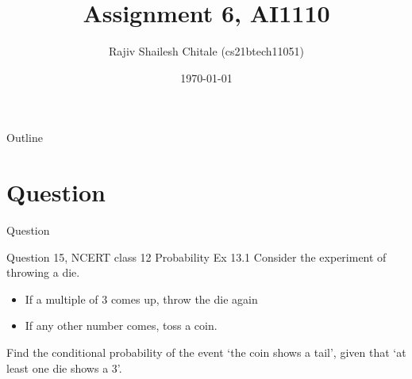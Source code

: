 \documentclass{beamer}
\begin{document}
\let\StandardTheFigure\thefigure
\let\vec\mathbf

\def\putbox#1#2#3{\makebox[0in][l]{\makebox[#1][l]{}\raisebox{\baselineskip}[0in][0in]{\raisebox{#2}[0in][0in]{#3}}}}
     \def\rightbox#1{\makebox[0in][r]{#1}}
     \def\centbox#1{\makebox[0in]{#1}}
     \def\topbox#1{\raisebox{-\baselineskip}[0in][0in]{#1}}
     \def\midbox#1{\raisebox{-0.5\baselineskip}[0in][0in]{#1}}
\vspace{3cm}


\title{Assignment 6, AI1110} 
\author{Rajiv Shailesh Chitale (cs21btech11051)}
\date{\today}
\logo{\large \LaTeX{}}
\begin{frame}
    \titlepage 
\end{frame}

\logo{}

\begin{frame}{Outline}
    \tableofcontents
\end{frame}
\section{Question}

\begin{frame}{Question}
     \begin{block}{ Question 15, NCERT class 12 Probability Ex 13.1}
    Consider the experiment of throwing a die.
    \begin{itemize}
        \item If a multiple of 3 comes up, throw the die again
        \item If any other number comes, toss a coin.
    \end{itemize}
     Find the conditional probability of the event \lq the coin shows a tail\rq, given that \lq at least one die shows a 3\rq.
     \end{block} 
\end{frame}
\end{document}
